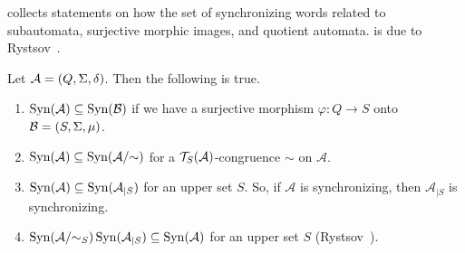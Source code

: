 
 collects statements on
how the set of synchronizing words related to subautomata, surjective morphic images,
and quotient automata. 
is due to Rystsov~\cite[Prop.~2.3]{Rystsov97}.

\begin{proposition}
	\label{prelim:cor:fact_sync_word}
	\label{prelim:prop:morphism_sync_word}
	\label{prelim:prop:sync_word_factor}
	\label{prelim:prop:sync_words_restriction}
	Let $\mathcal A = (Q, \Sigma, \delta)$. Then the following is true.
	
	\begin{enumerate}
		\item \label{prelim:Synsurj} $\operatorname{Syn}(\mathcal A) \subseteq \operatorname{Syn}(\mathcal B)$ if we have a surjective morphism $\varphi \colon Q \to S$ onto $\mathcal B = (S, \Sigma, \mu)$.
		
		\item \label{prelim:Syncongr} $\operatorname{Syn}(\mathcal A) \subseteq \operatorname{Syn}(\mathcal A / {\sim})$ for a $\mathcal T_S(\mathcal A)$-congruence $\sim$ on $\mathcal A$.
		
		\item \label{prelim:Synsubaut} $\operatorname{Syn}(\mathcal A) \subseteq \operatorname{Syn}(\mathcal A_{|S})$ for an upper set $S$.  So, 
		if $\mathcal A$ is synchronizing, then $\mathcal A_{|S}$ is synchronizing.
		
		\item \label{prelim:Synuv} $\operatorname{Syn}(\mathcal A / {\sim_S}) \operatorname{Syn}(\mathcal A_{|S}) \subseteq \operatorname{Syn}(\mathcal A)$ for an upper set $S$ (Rystsov~\cite[Prop.~2.3]{Rystsov97}).
		
	\end{enumerate}
\end{proposition}
